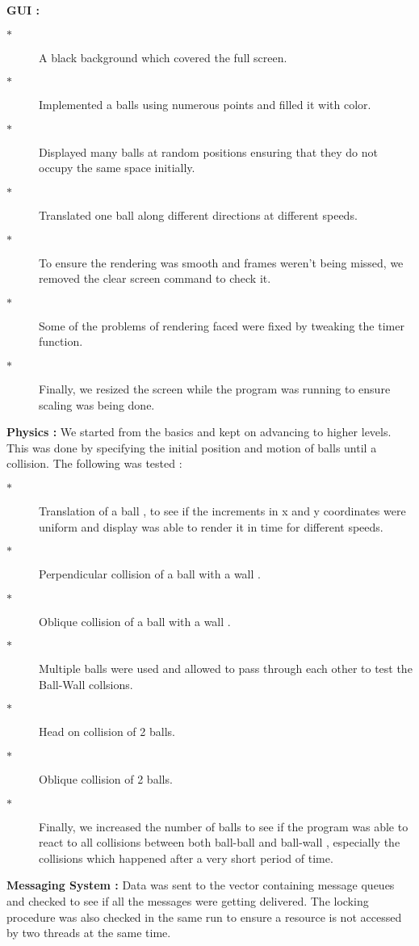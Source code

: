 \documentclass[a4paper]{article}
\begin{document}
\textbf{GUI : } 
\begin{description}
\item[$\ast$ ] A black background which covered the full screen.
\item[$\ast$ ] Implemented a balls using numerous points and filled it with color.
\item[$\ast$ ] Displayed many balls at random positions ensuring that they do not occupy the same space initially.
\item[$\ast$ ] Translated one ball along different directions at different speeds.
\item[$\ast$ ] To ensure the rendering was smooth and frames weren't being missed, we removed the clear screen command to check it.
\item[$\ast$ ]  Some of the problems of rendering faced were fixed by tweaking the timer function. 
\item[$\ast$ ] Finally, we resized the screen while the program was running to ensure scaling was being done.
\end{description}

\textbf{Physics :} We started from the basics and kept on advancing to higher levels. This was done by specifying the initial position and motion of balls until a collision. The following was tested :
\begin{description}
\item[$\ast$ ] Translation of a ball , to see if the increments in x and y coordinates were uniform and display was able to render it in time for different speeds.
\item[$\ast$ ] Perpendicular collision of a ball with a wall .  
\item[$\ast$ ] Oblique collision of a ball with a wall .
\item[$\ast$ ] Multiple balls were used and allowed to pass through each other to test the Ball-Wall collsions.
\item[$\ast$ ] Head on collision of 2 balls. 
\item[$\ast$ ] Oblique collision of 2 balls. 
\item[$\ast$ ] Finally, we increased the number of balls to see if the program was able to react to all collisions between both ball-ball and ball-wall , especially the collisions which happened after a very short period of time.
\end{description} 

\textbf{Messaging System : }Data was sent to the vector containing message queues and checked to see if all the messages were getting delivered. The locking procedure was also checked in the same run to ensure a resource is not accessed by two threads at the same time.
\end{document}

